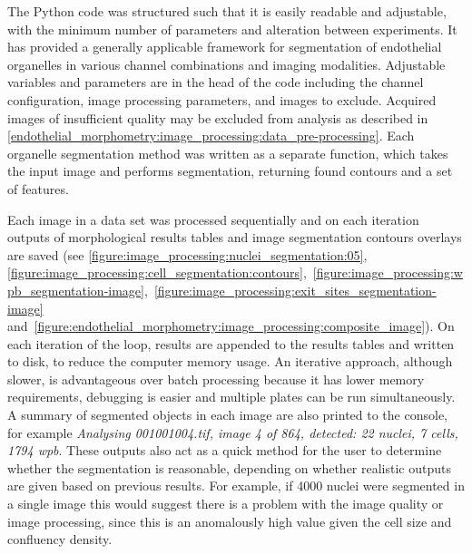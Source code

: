 The Python code was structured such that it is easily readable and adjustable, with the minimum number of parameters and alteration between experiments. It has provided a generally applicable framework for segmentation of endothelial organelles in various channel combinations and imaging modalities. Adjustable variables and parameters are in the head of the code including the channel configuration, image processing parameters, and images to exclude. Acquired images of insufficient quality may be excluded from analysis as described in \autoref{endothelial_morphometry:image_processing:data_pre-processing}. Each organelle segmentation method was written as a separate function, which takes the input image and performs segmentation, returning found contours and a set of features.

Each image in a data set was processed sequentially and on each iteration outputs of morphological results tables and image segmentation contours overlays are saved (see \autoref{figure:image_processing:nuclei_segmentation:05}, \autoref{figure:image_processing:cell_segmentation:contours},~\autoref{figure:image_processing:wpb_segmentation-image},~\autoref{figure:image_processing:exit_sites_segmentation-image} and~\autoref{figure:endothelial_morphometry:image_processing:composite_image}). On each iteration of the loop, results are appended to the results tables and written to disk, to reduce the computer memory usage. An iterative approach, although slower, is advantageous over batch processing because it has lower memory requirements, debugging is easier and multiple plates can be run simultaneously. A summary of segmented objects in each image are also printed to the console, for example \emph{Analysing 001001004.tif, image 4 of 864, detected: 22 nuclei, 7 cells, 1794 wpb}. These outputs also act as a quick method for the user to determine whether the segmentation is reasonable, depending on whether realistic outputs are given based on previous results. For example, if 4000 nuclei were segmented in a single image this would suggest there is a problem with the image quality or image processing, since this is an anomalously high value given the cell size and confluency density.


